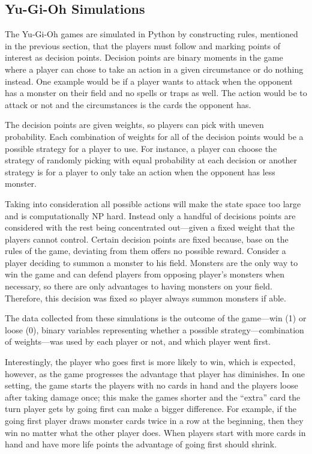 \subsection{Yu-Gi-Oh Simulations}
The Yu-Gi-Oh games are simulated in Python by constructing rules, mentioned in the previous section, that the players must follow and marking points of interest as decision points. Decision points are binary moments in the game where a player can chose to take an action in a given circumstance or do nothing instead. One example would be if a player wants to attack when the opponent has a monster on their field and no spells or traps as well. The action would be to attack or not and the circumstances is the cards the opponent has.

The decision points are given weights, so players can pick with uneven probability. Each combination of weights for all of the decision points would be a possible strategy for a player to use. For instance, a player can choose the strategy of randomly picking with equal probability at each decision or another strategy is for a player to only take an action when the opponent has less monster. 

Taking into consideration all possible actions will make the state space too large and is computationally NP hard. Instead only a handful of decisions points are considered with the rest being concentrated out---given a fixed weight that the players cannot control. Certain decision points are fixed because, base on the rules of the game, deviating from them offers no possible reward. Consider a player deciding to summon a monster to his field. Monsters are the only way to win the game and can defend players from opposing player's monsters when necessary, so there are only advantages to having monsters on your field. Therefore, this decision was fixed so player always summon monsters if able.

The data collected from these simulations is the outcome of the game---win (1) or loose (0), binary variables representing whether a possible strategy---combination of weights---was used by each player or not, and which player went first.

Interestingly, the player who goes first is more likely to win, which is expected, however, as the game progresses the advantage that player has diminishes. In one setting, the game starts the players with no cards in hand and the players loose after taking damage once; this make the games shorter and the ``extra'' card the turn player gets by going first can make a bigger difference. For example, if the going first player draws monster cards twice in a row at the beginning, then they win no matter what the other player does. When players start with more cards in hand and have more life points the advantage of going first should shrink.





